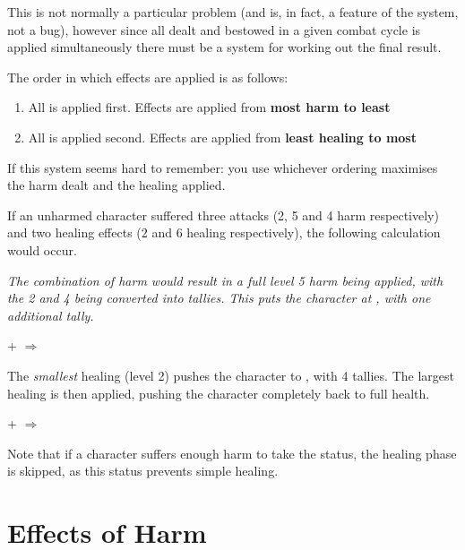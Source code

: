 This is not normally a particular problem (and is, in fact, a feature of the  system, not a bug), however since all  dealt and  bestowed in a given combat cycle is applied simultaneously there must be a system for working out the final result. 

The order in which effects are applied is as follows:

\begin{enumerate}
	\item All  is applied first. Effects are applied from {\bf most harm to least}
	\item All  is applied second. Effects are applied from {\bf least healing to most}
\end{enumerate}

If this system seems hard to remember: {\imp you use whichever ordering maximises the harm dealt and the healing applied}. 

If an unharmed character suffered three attacks (2, 5 and 4 harm respectively) and two healing effects (2 and 6 healing respectively), the following calculation would occur.

{\it The combination of harm would result in a full level 5 harm being applied, with the 2 and 4 being converted into tallies. This puts the character at , with one additional tally.
 
\begin{center}
	 + $\Longrightarrow$
\end{center}

The {\it smallest} healing (level 2) pushes the character to , with 4 tallies. The largest healing is then applied, pushing the character completely back to full health. }


\begin{center}
	 + $\Longrightarrow$
\end{center} 

Note that if a character suffers enough harm to take the  status, the healing phase is skipped, as this status prevents simple healing.


\section{Effects of Harm}

